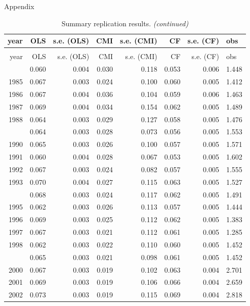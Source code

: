 \documentclass[10pt,ignorenonframetext,]{beamer}
\begin{document}
\begin{frame}[allowframebreaks]{Appendix}
\begingroup\fontsize{7}{9}\selectfont

\begin{longtable}[t]{rrrrrrrl}
\caption{\label{tab:unnamed-chunk-4}Summary replication results.}\\
\toprule
year & OLS & s.e. (OLS) & CMI & s.e. (CMI) & CF & s.e. (CF) & obs\\
\midrule
\endfirsthead
\caption[]{Summary replication results. \textit{(continued)}}\\
\toprule
year & OLS & s.e. (OLS) & CMI & s.e. (CMI) & CF & s.e. (CF) & obs\\
\midrule
\endhead
\
\endfoot
\bottomrule
\endlastfoot
1984 & 0.060 & 0.004 & 0.030 & 0.118 & 0.053 & 0.006 & 1.448\\
1985 & 0.067 & 0.003 & 0.024 & 0.100 & 0.060 & 0.005 & 1.412\\
1986 & 0.067 & 0.004 & 0.036 & 0.104 & 0.059 & 0.006 & 1.463\\
1987 & 0.069 & 0.004 & 0.034 & 0.154 & 0.062 & 0.005 & 1.489\\
1988 & 0.064 & 0.003 & 0.029 & 0.127 & 0.058 & 0.005 & 1.476\\
\addlinespace
1989 & 0.064 & 0.003 & 0.028 & 0.073 & 0.056 & 0.005 & 1.553\\
1990 & 0.065 & 0.003 & 0.026 & 0.100 & 0.057 & 0.005 & 1.571\\
1991 & 0.060 & 0.004 & 0.028 & 0.067 & 0.053 & 0.005 & 1.602\\
1992 & 0.067 & 0.003 & 0.024 & 0.082 & 0.057 & 0.005 & 1.555\\
1993 & 0.070 & 0.004 & 0.027 & 0.115 & 0.063 & 0.005 & 1.527\\
\addlinespace
1994 & 0.068 & 0.003 & 0.024 & 0.117 & 0.062 & 0.005 & 1.491\\
1995 & 0.062 & 0.003 & 0.026 & 0.113 & 0.057 & 0.005 & 1.444\\
1996 & 0.069 & 0.003 & 0.025 & 0.112 & 0.062 & 0.005 & 1.383\\
1997 & 0.067 & 0.003 & 0.021 & 0.112 & 0.061 & 0.005 & 1.285\\
1998 & 0.062 & 0.003 & 0.022 & 0.110 & 0.060 & 0.005 & 1.452\\
\addlinespace
1999 & 0.065 & 0.003 & 0.021 & 0.098 & 0.061 & 0.005 & 1.452\\
2000 & 0.067 & 0.003 & 0.019 & 0.102 & 0.063 & 0.004 & 2.701\\
2001 & 0.069 & 0.003 & 0.019 & 0.106 & 0.066 & 0.004 & 2.659\\
2002 & 0.073 & 0.003 & 0.019 & 0.115 & 0.069 & 0.004 & 2.818\\

\end{longtable}
\end{frame}
\end{document}
